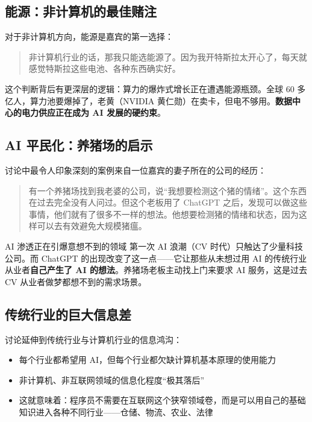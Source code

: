\documentclass[a4paper]{article}
\begin{document}
\subsection{能源：非计算机的最佳赌注}

对于非计算机方向，能源是嘉宾的第一选择：

\begin{quote}
非计算机行业的话，那我只能选能源了。因为我开特斯拉太开心了，每天就感觉特斯拉这些电池、各种东西确实好。
\end{quote}

这个判断背后有更深层的逻辑：算力的爆炸式增长正在遭遇能源瓶颈。全球 60 多亿人，算力池要爆掉了，老黄（NVIDIA 黄仁勋）在卖卡，但电不够用。\textbf{数据中心的电力供应正在成为 AI 发展的硬约束}。

\subsection{AI 平民化：养猪场的启示}

讨论中最令人印象深刻的案例来自一位嘉宾的妻子所在的公司的经历：

\begin{quote}
有一个养猪场找到我老婆的公司，说``我想要检测这个猪的情绪''。这个东西在过去完全没有人问过。但这个老板用了 ChatGPT 之后，发现可以做这些事情，他们就有了很多不一样的想法。他想要检测猪的情绪和状态，因为这样可以去有效避免大规模猪瘟。
\end{quote}

\begin{importantbox}{AI 渗透正在引爆意想不到的领域}
第一次 AI 浪潮（CV 时代）只触达了少量科技公司。而 ChatGPT 的出现改变了这一点——它让那些从未想过用 AI 的传统行业从业者\textbf{自己产生了 AI 的想法}。养猪场老板主动找上门来要求 AI 服务，这是过去 CV 从业者做梦都想不到的需求场景。
\end{importantbox}

\subsection{传统行业的巨大信息差}

讨论延伸到传统行业与计算机行业的信息鸿沟：

\begin{itemize}
    \item 每个行业都希望用 AI，但每个行业都欠缺计算机基本原理的使用能力
    \item 非计算机、非互联网领域的信息化程度``极其落后''
    \item 这就意味着：程序员不需要在互联网这个狭窄领域卷，而是可以用自己的基础知识进入各种不同行业——仓储、物流、农业、法律
\end{itemize}
\end{document}
